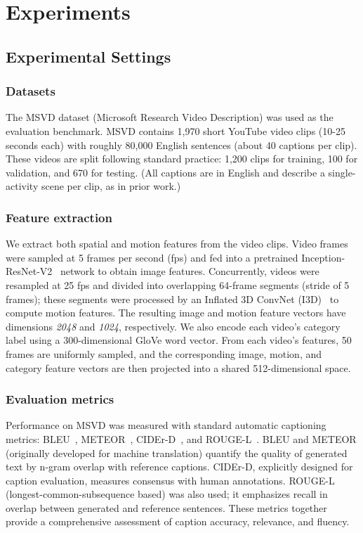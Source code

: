 \section{Experiments}

\subsection{Experimental Settings}

\subsubsection{Datasets}

The MSVD dataset (Microsoft Research Video Description) was used as the evaluation benchmark. MSVD contains 1,970 short YouTube video clips (10-25 seconds each) with roughly 80,000 English sentences (about 40 captions per clip). These videos are split following standard practice: 1,200 clips for training, 100 for validation, and 670 for testing. (All captions are in English and describe a single-activity scene per clip, as in prior work.)

\subsubsection{Feature extraction}

We extract both spatial and motion features from the video clips. Video frames were sampled at 5 frames per second (fps) and fed into a pretrained Inception-ResNet-V2~\cite{szegedy2016inceptionv4} network to obtain image features. Concurrently, videos were resampled at 25 fps and divided into overlapping 64-frame segments (stride of 5 frames); these segments were processed by an Inflated 3D ConvNet (I3D)~\cite{Carreira_2017_CVPR} to compute motion features. The resulting image and motion feature vectors have dimensions \textit{2048} and \textit{1024}, respectively. We also encode each video's category label using a 300-dimensional GloVe word vector. From each video's features, 50 frames are uniformly sampled, and the corresponding image, motion, and category feature vectors are then projected into a shared 512-dimensional space.

\subsubsection{Evaluation metrics}

Performance on MSVD was measured with standard automatic captioning metrics: BLEU~\cite{papineni-etal-2002-bleu}, METEOR~\cite{banerjee-lavie-2005-meteor}, CIDEr-D~\cite{vedantam2015cider}, and ROUGE-L~\cite{lin-2004-rouge}. BLEU and METEOR (originally developed for machine translation) quantify the quality of generated text by n-gram overlap with reference captions. CIDEr-D, explicitly designed for caption evaluation, measures consensus with human annotations. ROUGE-L (longest-common-subsequence based) was also used; it emphasizes recall in overlap between generated and reference sentences. These metrics together provide a comprehensive assessment of caption accuracy, relevance, and fluency.


